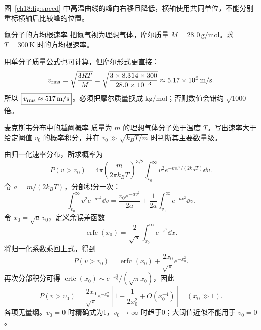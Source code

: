 \begin{center}
\label{ch18:fig:speed}
\end{center}
图~\ref{ch18:fig:speed} 中高温曲线的峰向右移且降低，横轴使用共同单位，不能分别重标横轴后比较峰的位置。

\begin{origexamplebox}{氮分子的方均根速率}
把氮气视为理想气体，摩尔质量 $M=28.0\,\mathrm{g/mol}$。求 $T=300\,\mathrm K$ 时的方均根速率。
\end{origexamplebox}
\begin{xesolution}
用单分子质量公式也可计算，但摩尔形式更直接：
\[
 v_{\rm rms}=\sqrt{\frac{3RT}{M}}
 =\sqrt{\frac{3\times8.314\times300}{28.0\times10^{-3}}}
 \approx5.17\times10^2\,\mathrm{m/s}.
\]
所以 $\boxed{v_{\rm rms}\approx517\,\mathrm{m/s}}$。必须把摩尔质量换成 $\mathrm{kg/mol}$；否则数值会错约 $\sqrt{1000}$ 倍。
\end{xesolution}

\begin{origexamplebox}{麦克斯韦分布中的越阈概率}
质量为 $m$ 的理想气体分子处于温度 $T$。写出速率大于给定阈值 $v_0$ 的概率积分，并在
$v_0\gg\sqrt{k_BT/m}$ 时判断其主要数量级。
\end{origexamplebox}
\begin{xesolution}
由归一化速率分布，所求概率为
\[
 P(v>v_0)=4\pi\left(\frac{m}{2\pi k_BT}\right)^{3/2}
 \int_{v_0}^{\infty}v^2e^{-mv^2/(2k_BT)}\dd v.
\]
令 $a=m/(2k_BT)$，分部积分一次：
\[
 \int_{v_0}^{\infty}v^2e^{-av^2}\dd v
 =\frac{v_0e^{-av_0^2}}{2a}
 +\frac1{2a}\int_{v_0}^{\infty}e^{-av^2}\dd v.
\]
令 $x_0=\sqrt a\,v_0$，定义余误差函数
\[\operatorname{erfc}(x_0)=\frac2{\sqrt\pi}\int_{x_0}^{\infty}e^{-x^2}\dd x.\]
将归一化系数乘回上式，得到
\[
 \boxed{P(v>v_0)=\operatorname{erfc}(x_0)+\frac{2x_0}{\sqrt\pi}e^{-x_0^2}}.
\]
再次分部积分可得 $\operatorname{erfc}(x_0)\sim e^{-x_0^2}/(\sqrt\pi x_0)$，因此
\[P(v>v_0)=\frac{2x_0}{\sqrt\pi}e^{-x_0^2}
\left[1+\frac1{2x_0^2}+O(x_0^{-4})\right]\quad(x_0\gg1).\]
各项无量纲。$v_0=0$ 时精确式为1，$v_0\to\infty$ 时趋于0；大阈值近似不能用于 $v_0=0$。
\end{xesolution}

